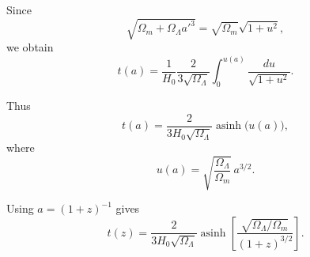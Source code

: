 \documentclass[letterpaper,12pt]{article}
\begin{document}
Since
\[
\sqrt{\Omega_m+\Omega_\Lambda a'^3}
=
\sqrt{\Omega_m}\sqrt{1+u^2},
\]
we obtain
\[
t(a)=
\frac{1}{H_0}
\frac{2}{3\sqrt{\Omega_\Lambda}}
\int_0^{u(a)}
\frac{du}{\sqrt{1+u^2}}.
\]

Thus
\[
t(a)=
\frac{2}{3H_0\sqrt{\Omega_\Lambda}}
\operatorname{asinh}\!\big(u(a)\big),
\]
where
\[
u(a)=
\sqrt{\frac{\Omega_\Lambda}{\Omega_m}}\,a^{3/2}.
\]

Using $a=(1+z)^{-1}$ gives
\[
\boxed{
t(z)=
\frac{2}{3H_0\sqrt{\Omega_\Lambda}}
\operatorname{asinh}
\left[
\frac{\sqrt{\Omega_\Lambda/\Omega_m}}{(1+z)^{3/2}}
\right]
}.
\]
\end{document}
